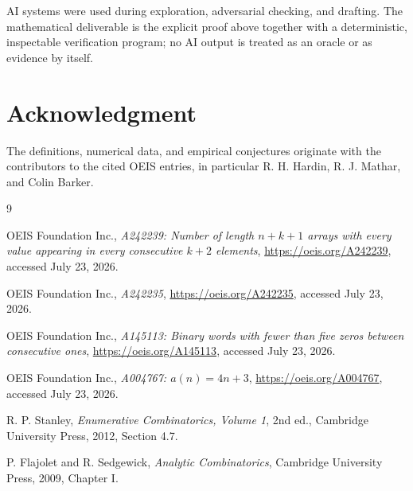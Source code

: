 \documentclass[11pt]{article}
\theoremstyle{remark}
\begin{document}
AI systems were used during exploration, adversarial checking, and drafting.
The mathematical deliverable is the explicit proof above together with a
deterministic, inspectable verification program; no AI output is treated as an
oracle or as evidence by itself.

\section*{Acknowledgment}
The definitions, numerical data, and empirical conjectures originate with the
contributors to the cited OEIS entries, in particular R. H. Hardin, R. J.
Mathar, and Colin Barker.

\begin{thebibliography}{9}

OEIS Foundation Inc.,
\emph{A242239: Number of length $n+k+1$ arrays with every value appearing in
every consecutive $k+2$ elements},
\url{https://oeis.org/A242239}, accessed July 23, 2026.

OEIS Foundation Inc.,
\emph{A242235},
\url{https://oeis.org/A242235}, accessed July 23, 2026.

OEIS Foundation Inc.,
\emph{A145113: Binary words with fewer than five zeros between consecutive
ones},
\url{https://oeis.org/A145113}, accessed July 23, 2026.

OEIS Foundation Inc.,
\emph{A004767: $a(n)=4n+3$},
\url{https://oeis.org/A004767}, accessed July 23, 2026.

R. P. Stanley,
\emph{Enumerative Combinatorics, Volume 1}, 2nd ed.,
Cambridge University Press, 2012, Section 4.7.

P. Flajolet and R. Sedgewick,
\emph{Analytic Combinatorics},
Cambridge University Press, 2009, Chapter I.

\end{thebibliography}
\end{document}
